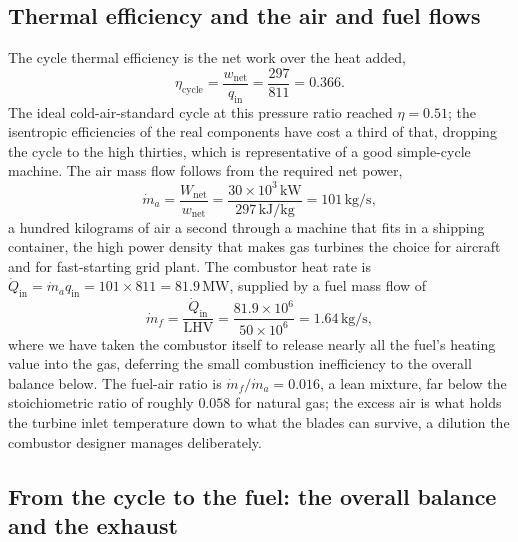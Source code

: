 \subsection{Thermal efficiency and the air and fuel flows}

The cycle thermal efficiency is the net work over the heat added,
\[
\eta_{\text{cycle}} = \frac{w_{\text{net}}}{q_{\text{in}}}
  = \frac{297}{811} = 0.366.
\]
The ideal cold-air-standard cycle at this pressure ratio reached
$\eta = 0.51$; the isentropic efficiencies of the real components have
cost a third of that, dropping the cycle to the high thirties, which is
representative of a good simple-cycle machine. The air mass flow follows
from the required net power,
\[
\dot{m}_a = \frac{W_{\text{net}}}{w_{\text{net}}}
  = \frac{30 \times 10^3\,\text{kW}}{297\,\text{kJ}/\text{kg}}
  = 101\,\text{kg}/\text{s},
\]
a hundred kilograms of air a second through a machine that fits in a
shipping container, the high power density that makes gas turbines the
choice for aircraft and for fast-starting grid plant. The combustor heat
rate is $\dot{Q}_{\text{in}} = \dot{m}_a q_{\text{in}} = 101 \times 811 =
81.9\,\text{MW}$, supplied by a fuel mass flow of
\[
\dot{m}_f = \frac{\dot{Q}_{\text{in}}}{\text{LHV}}
  = \frac{81.9 \times 10^6}{50 \times 10^6} = 1.64\,\text{kg}/\text{s},
\]
where we have taken the combustor itself to release nearly all the
fuel's heating value into the gas, deferring the small combustion
inefficiency to the overall balance below. The fuel-air ratio is
$\dot{m}_f/\dot{m}_a = 0.016$, a lean mixture, far below the
stoichiometric ratio of roughly $0.058$ for natural gas; the excess air
is what holds the turbine inlet temperature down to what the blades can
survive, a dilution the combustor designer manages deliberately.

\subsection{From the cycle to the fuel: the overall balance and the exhaust}


